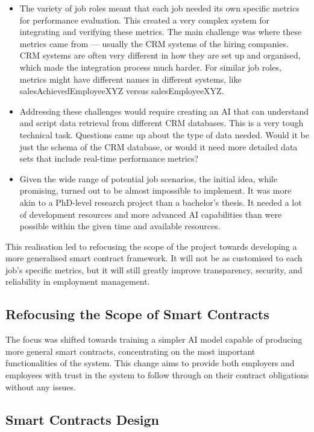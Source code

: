 \begin{itemize}
    \item The variety of job roles meant that each job needed its own specific metrics for performance evaluation. This created a very complex system for integrating and verifying these metrics. The main challenge was where these metrics came from — usually the CRM systems of the hiring companies. CRM systems are often very different in how they are set up and organised, which made the integration process much harder. For similar job roles, metrics might have different names in different systems, like salesAchievedEmployeeXYZ versus salesEmployeeXYZ.
    \item Addressing these challenges would require creating an AI that can understand and script data retrieval from different CRM databases. This is a very tough technical task. Questions came up about the type of data needed. Would it be just the schema of the CRM database, or would it need more detailed data sets that include real-time performance metrics?
    \item Given the wide range of potential job scenarios, the initial idea, while promising, turned out to be almost impossible to implement. It was more akin to a PhD-level research project than a bachelor's thesis. It needed a lot of development resources and more advanced AI capabilities than were possible within the given time and available resources.
\end{itemize}

This realisation led to refocusing the scope of the project towards developing a more generalised smart contract framework. It will not be as customised to each job's specific metrics, but it will still greatly improve transparency, security, and reliability in employment management.

\subsection{Refocusing the Scope of Smart Contracts}

The focus was shifted towards training a simpler AI model capable of producing more general smart contracts, concentrating on the most important functionalities of the system. This change aims to provide both employers and employees with trust in the system to follow through on their contract obligations without any issues.

\subsection{Smart Contracts Design}

